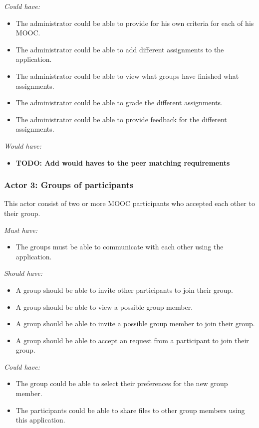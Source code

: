 \documentclass[]{article}
\newcommand{\TODO}[1]{{\color{red}\textbf{TODO: #1}}}
\newcommand{\reqr}[1]{{\noindent\emph{#1:}}}
\begin{document}
\reqr{Could have}
\begin{itemize}
\item The administrator could be able to provide for his own criteria for each of his MOOC.
\item The administrator could be able to add different assignments to the application.
\item The administrator could be able to view what groups have finished what assignments.
\item The administrator could be able to grade the different assignments.
\item The administrator could be able to provide feedback for the different assignments.
\end{itemize}

\reqr{Would have}
\begin{itemize}
\item \TODO{Add would haves to the peer matching requirements}
\end{itemize}


\subsubsection{Actor 3: Groups of participants}
This actor consist of two or more MOOC participants who accepted each other to their group.

\reqr{Must have}
\begin{itemize}
\item The groups must be able to communicate with each other using the application.
\end{itemize}

\reqr{Should have}
\begin{itemize}
\item A group should be able to invite other participants to join their group.
\item A group should be able to view a possible group member.
\item A group should be able to invite a possible group member to join their group.
\item A group should be able to accept an request from a participant to join their group.
\end{itemize}

\reqr{Could have}
\begin{itemize}
\item The group could be able to select their preferences for the new group member.
\item The participants could be able to share files to other group members using this application.
\end{itemize}
\end{document}
